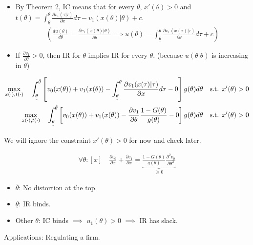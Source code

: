 \documentclass[11pt,leqno]{article}
\begin{document}
\begin{itemize}
    \item By Theorem 2, IC means that for every $\theta$, $x'(\theta)>0$ and $t(\theta)=\int_{\underset{\bar{}}{\theta}}^{\theta} \frac{\partial v_{1}(\tau|\tau)}{\partial x} d \tau-v_{1}(x(\theta)|\theta)+c$.
    \begin{align*}
    \left(\frac{d u(\theta)}{d \theta}=\frac{\partial v_{1}(x(\theta)|\theta)}{\partial \theta} \implies u(\theta)=\int_{\underset{\bar{}}{\theta}}^{\theta} \frac{\partial v_{1}(x(\tau)|\tau)}{\partial \theta} d \tau +c \right)
    \end{align*}
    \item If $\frac{\partial v_{1}}{\partial \theta}>0$, then IR for $\underset{\bar{}}{\theta}$ implies IR for every $\theta$. (because $u(\theta|\theta)$ is increasing in $\theta$)
\end{itemize}

\begin{align}
    \max_{x(\cdot),t(\cdot)} \quad \int_{\underset{\bar{}}{\theta}}^{\hat{\theta}} \left[v_{0}(x(\theta))+v_{1}(x(\theta))-\int_{\underset{\bar{}}{\theta}}^{\theta} \frac{\partial v_{1}(x(\tau)|\tau)}{\partial x} d \tau-0\right] g(\theta) d\theta \quad \text{s.t. } x'(\theta)>0 \notag\\
     \max_{x(\cdot),t(\cdot)} \quad \int_{\underset{\bar{}}{\theta}}^{\hat{\theta}} \left[v_{0}(x(\theta))+v_{1}(x(\theta))-\frac{\partial v_{1}}{\partial \theta} \frac{1-G(\theta)}{g(\theta)}-0\right] g(\theta) d\theta \quad \text{s.t. } x'(\theta)>0 \notag
\end{align}

We will ignore the constraint $x'(\theta)>0$ for now and check later.

\begin{align*}
\forall \theta: [x] \quad \frac{\partial v_{0}}{\partial x} + \frac{\partial v_{1}}{\partial x} = \underbrace{\frac{1-G(\theta)}{g(\theta)} \frac{\partial^{2} v_{0}}{\partial \theta^{2}}}_{\geq 0}
\end{align*}

\begin{itemize}
    \item $\bar{\theta}$: No distortion at the top.
    \item $\underset{\bar{}}{\theta}$: IR binds. 
    \item Other $\theta$: IC binds $\implies$ $u_{1}(\theta)>0$ $\implies$ IR has slack. 
\end{itemize}

Applications: Regulating a firm.
\end{document}
